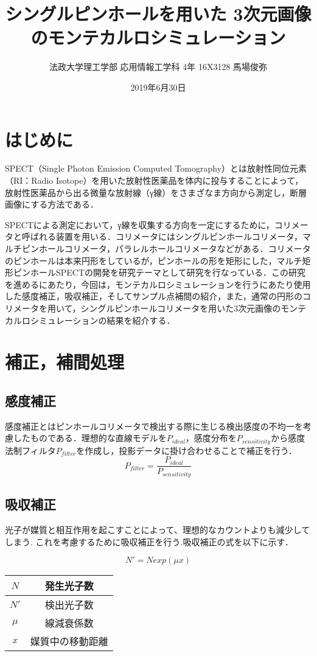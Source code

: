 \documentclass[dvipdfmx,autodetect-engine,twocolumn,10pt]{jsarticle}%
\title{シングルピンホールを用いた
3次元画像のモンテカルロシミュレーション}
\author{法政大学理工学部 応用情報工学科 4年 16X3128 馬場俊弥}
\date{2019年6月30日}
\begin{document}
\maketitle
\section{はじめに}
SPECT（Single Photon Emission Computed Tomography）とは放射性同位元素（RI：Radio Isotope）を用いた放射性医薬品を体内に投与することによって，放射性医薬品から出る微量な放射線（γ線）をさまざなま方向から測定し，断層画像にする方法である．

SPECTによる測定において，γ線を収集する方向を一定にするために，コリメータと呼ばれる装置を用いる．コリメータにはシングルピンホールコリメータ，マルチピンホールコリメータ，パラレルホールコリメータなどがある．コリメータのピンホールは本来円形をしているが，ピンホールの形を矩形にした，マルチ矩形ピンホールSPECTの開発を研究テーマとして研究を行なっている．この研究を進めるにあたり，今回は，モンテカルロシミュレーションを行うにあたり使用した感度補正，吸収補正，そしてサンプル点補間の紹介，また，通常の円形のコリメータを用いて，シングルピンホールコリメータを用いた3次元画像のモンテカルロシミュレーションの結果を紹介する．


\section{補正，補間処理}

\subsection{感度補正}
感度補正とはピンホールコリメータで検出する際に生じる検出感度の不均一を考慮したものである．理想的な直線モデルを$P_{ideal}$，感度分布を$P_{sensitivity}$から感度法制フィルタ$P_{filter}$を作成し，投影データに掛け合わせることで補正を行う．
\[
  P_{filter} = \frac{P_{ideal}}{P_{sensitivity}}
\]

\subsection{吸収補正}
光子が媒質と相互作用を起こすことによって、理想的なカウントよりも減少してしまう. これを考慮するために吸収補正を行う.吸収補正の式を以下に示す．

\[
  N' = N exp(\mu x)
\]

\begin{table}[htbp]
  \begin{center}
    \begin{tabular}{|c|c|} \hline
      $N$ & 発生光子数 \\ \hline
      $N'$ & 検出光子数 \\ \hline
      $\mu$ & 線減衰係数 \\ \hline
      $x$ & 媒質中の移動距離 \\ \hline
    \end{tabular}
  \end{center}
\end{table}
\end{document}

